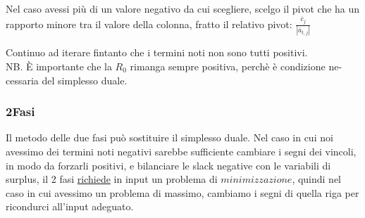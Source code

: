 \documentclass{article}
\begin{document}
\begin{center}
\end{center}

Nel caso avessi più di un valore negativo da cui scegliere, scelgo il pivot che ha un rapporto minore tra il valore della colonna, fratto il relativo pivot: $\frac{\overline{c}_j}{|\overline{a}_{t,j}|}$\\

\begin{center}
\end{center}
Continuo ad iterare fintanto che i termini noti non sono tutti positivi.\\
NB. È importante che la $R_0$ rimanga sempre positiva, perchè è condizione ne-cessaria del simplesso duale.

\subsubsection{2Fasi}
Il metodo delle due fasi può sostituire il simplesso duale. Nel caso in cui noi avessimo dei termini noti negativi sarebbe sufficiente cambiare i segni dei vincoli, in modo da forzarli positivi, e bilanciare le slack negative con le variabili di surplus, il 2 fasi \underline{richiede} in input un problema di $minimizzazione$, quindi nel caso in cui avessimo un problema di massimo, cambiamo i segni di quella riga per ricondurci all'input adeguato.\\

\begin{center}
\end{center}
\end{document}
